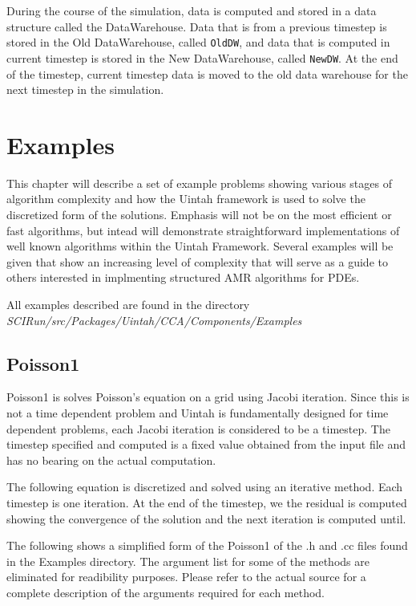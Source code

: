 \documentclass[12pt]{report}
\begin{document}
During the course of the simulation, data is computed and stored in a
data structure called the DataWarehouse.  Data that is from a previous
timestep is stored in the Old DataWarehouse, called \texttt{OldDW},
and data that is computed in current timestep is stored in the New
DataWarehouse, called \texttt{NewDW}.  At the end of the timestep,
current timestep data is moved to the old data warehouse for the next
timestep in the simulation.

\chapter{Examples}


This chapter will describe a set of example problems showing various
stages of algorithm complexity and how the Uintah framework is used to
solve the discretized form of the solutions.  Emphasis will not be on
the most efficient or fast algorithms, but intead will demonstrate
straightforward implementations of well known algorithms within the
Uintah Framework.  Several examples will be given that show an
increasing level of complexity that will serve as a guide to others
interested in implmenting structured AMR algorithms for PDEs.

All examples described are found in the directory
\emph{SCIRun/src/Packages/Uintah/CCA/Components/Examples}

\section{Poisson1}

Poisson1 is solves Poisson's equation on a grid using Jacobi
iteration.  Since this is not a time dependent problem and Uintah is
fundamentally designed for time dependent problems, each Jacobi
iteration is considered to be a timestep.  The timestep specified and
computed is a fixed value obtained from the input file and has no
bearing on the actual computation.

The following equation is discretized and solved using an iterative
method. Each timestep is one iteration. At the end of the timestep, we
the residual is computed showing the convergence of the solution and
the next iteration is computed until.

The following shows a simplified form of the Poisson1 of the .h and
.cc files found in the Examples directory.  The argument list for some
of the methods are eliminated for readibility purposes.  Please refer
to the actual source for a complete description of the arguments
required for each method.
\end{document}
